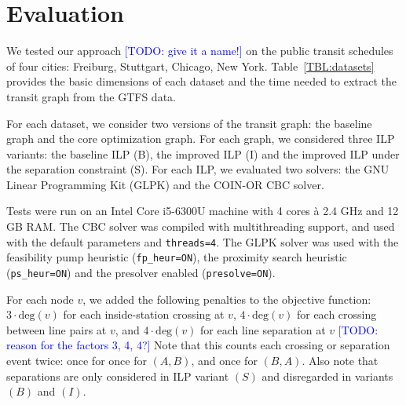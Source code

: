 \documentclass{llncs}
\newcommand\TODO[1]{\textcolor{blue}{\small [TODO: #1]}}
\begin{document}
%
\section{Evaluation}
%

We tested our approach \TODO{give it a name!} on the public transit schedules of four cities: Freiburg, Stuttgart, Chicago, New York.
Table~\ref{TBL:datasets} provides the basic dimensions of each dataset and the time needed to extract the transit graph from the GTFS data.

For each dataset, we consider two versions of the transit graph: the baseline graph and the core optimization graph.
For each graph, we considered three ILP variants: the baseline ILP (B), the improved ILP (I) and the improved ILP under the separation constraint (S).
For each ILP, we evaluated two solvers: the GNU Linear Programming Kit (GLPK) and the COIN-OR CBC solver.

Tests were run on an Intel Core i5-6300U machine with 4 cores \`{a} 2.4 GHz and 12 GB RAM.
The CBC solver was compiled with multithreading support, and used with the default parameters and \texttt{threads=4}.
The GLPK solver was used with the feasibility pump heuristic (\texttt{fp\_heur=ON}), the proximity search heuristic (\texttt{ps\_heur=ON}) and the presolver enabled (\texttt{presolve=ON}).

\def\degv{\text{deg}(v)}
\def\Hms{$\,$ms}
\def\Hs{$\,$s}
\def\Hm{$\,$m}
\def\Hh{$\,$h}
For each node $v$, we added the following penalties to the objective function: $3\cdot \degv$ for each inside-station crossing at $v$, $4\cdot\degv$ for each crossing between line pairs at $v$, and $4\cdot\degv$ for each line separation at $v$ \TODO{reason for the factors 3, 4, 4?}
Note that this counts each crossing or separation event twice: once for once for $(A, B)$, and once for $(B, A)$.
Also note that separations are only considered in ILP variant $(S)$ and disregarded in variants $(B)$ and $(I)$.
\end{document}
